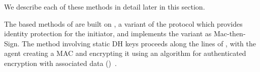 We describe each of these methods in detail later in this section.


The \mSig based methods of \mEdhoc are built on \mSigmaI, a variant of the \mSigma protocol which provides identity protection for the initiator, and  implements the \mSigmaI variant as Mac-then-Sign. The method involving static DH keys proceeds along the lines of \mOptls, with the agent creating a MAC and encrypting it using an algorithm for authenticated encryption with associated data (\mAead)~\cite{aead,rfc5116}. 

%

%
%

